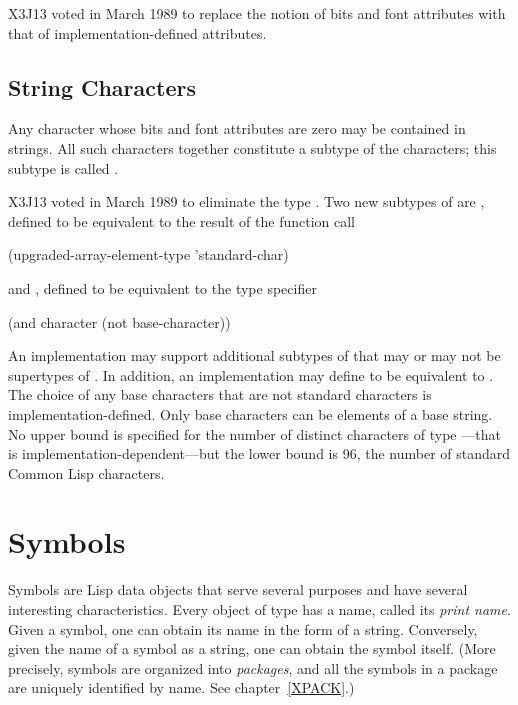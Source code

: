 \begin{newer}
X3J13 voted in March 1989 
to replace the notion of bits and font attributes with
that of implementation-defined attributes.
\end{newer}

\begin{obsolete}
\subsection{String Characters}

Any character whose bits and font attributes are zero may be contained
in strings.  All such characters together constitute a subtype of
the characters; this subtype is called .
\end{obsolete}


\begin{newer}
X3J13 voted in March 1989 
to eliminate the type .
Two new subtypes of  are ,
defined to be equivalent to the result of the function call
\begin{lisp}
(upgraded-array-element-type 'standard-char)
\end{lisp}
and , defined to be equivalent to the type specifier
\begin{lisp}
(and character (not base-character))
\end{lisp}
An implementation may support additional subtypes of 
that may or may not be supertypes of .
In addition, an implementation may define 
to be equivalent to .  The choice of any base characters
that are not standard characters is implementation-defined.
Only base characters can be elements of a base string.
No upper bound is specified for the number of distinct characters
of type ---that is implementation-dependent---but the lower
bound is 96, the number of standard Common Lisp characters.
\end{newer}

\section{Symbols}

Symbols are Lisp data objects that serve several purposes
and have several interesting characteristics.  Every object of
type  has a name,
called its {\it print name}.  Given a symbol, one can
obtain its name in the form of a string.  Conversely,
given the name of a symbol as a string, one can obtain the
symbol itself.  (More precisely, symbols are organized into
{\it packages}, and all the symbols in a package are uniquely
identified by name.  See chapter~\ref{XPACK}.)

